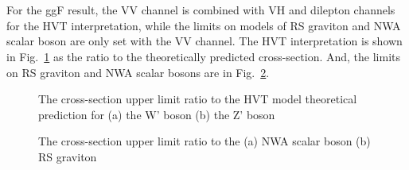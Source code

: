 \noindent
\\
\\For the ggF result, the VV channel is combined with VH and dilepton channels for the HVT interpretation, while the limits on models of RS graviton and NWA scalar boson are only set with the VV channel. The HVT interpretation is shown in Fig.~\ref{Fig:limit_GGFHVT_comb} as the ratio to the theoretically predicted cross-section. And, the limits on RS graviton and NWA scalar bosons are in Fig.~\ref{Fig:limit_GGF_comb}.
\begin{figure}[ht]
	\centering
	\caption{The cross-section upper limit ratio to the HVT model theoretical prediction for (a) the W' boson (b) the Z' boson }
	\label{Fig:limit_GGFHVT_comb}
\end{figure}
\begin{figure}[ht]
	\centering
	\caption{The cross-section upper limit ratio to the (a) NWA scalar boson (b) RS graviton}
	\label{Fig:limit_GGF_comb}
\end{figure}
